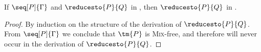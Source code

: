 \begin{theorem}\label{thm:hcp2cp-reduction}
  If $\seq[P]{\Gamma}$ and $\reducesto{P}{Q}$ in \hcp, then $\reducesto{P}{Q}$ in \cp.
\end{theorem}
\begin{proof}
  By induction on the structure of the derivation of $\reducesto{P}{Q}$.
  From $\seq[P]{\Gamma}$ we conclude that $\tm{P}$ is \textsc{Mix}-free, and
  therefore \hcpRedGammaMix will never occur in the derivation of $\reducesto{P}{Q}$.
\end{proof}